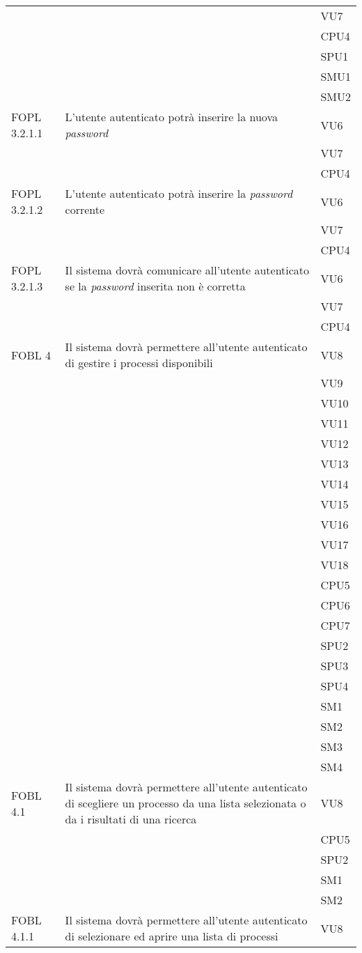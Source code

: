 \begin{longtable}{lXl}
&&VU7\\
&&CPU4\\
&&SPU1\\
&&SMU1\\
&&SMU2\\
\midrule
FOPL 3.2.1.1&L'utente autenticato potrà inserire la nuova \textit{password}&VU6\\
&&VU7\\
&&CPU4\\
\midrule
FOPL 3.2.1.2&L'utente autenticato potrà inserire la \textit{password} corrente&VU6\\
&&VU7\\
&&CPU4\\
\midrule
FOPL 3.2.1.3&Il sistema dovrà comunicare all'utente autenticato se la \textit{password} inserita non è corretta&VU6\\
&&VU7\\
&&CPU4\\
\midrule
FOBL 4&Il sistema dovrà permettere all'utente autenticato di gestire i processi disponibili&VU8\\
&&VU9\\
&&VU10\\
&&VU11\\
&&VU12\\
&&VU13\\
&&VU14\\
&&VU15\\
&&VU16\\
&&VU17\\
&&VU18\\
&&CPU5\\
&&CPU6\\
&&CPU7\\
&&SPU2\\
&&SPU3\\
&&SPU4\\
&&SM1\\
&&SM2\\
&&SM3\\
&&SM4\\
\midrule
FOBL 4.1&Il sistema dovrà permettere all'utente autenticato di scegliere un processo da una lista selezionata o da i risultati di una ricerca&VU8\\
&&CPU5\\
&&SPU2\\
&&SM1\\
&&SM2\\
\midrule
FOBL 4.1.1&Il sistema dovrà permettere all'utente autenticato di selezionare ed aprire una lista di processi&VU8\\

\end{longtable}
